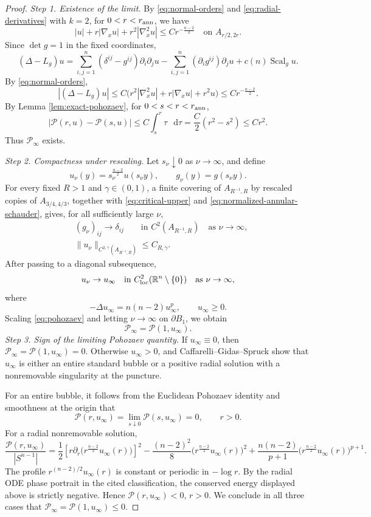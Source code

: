 \documentclass[11pt]{article}
\numberwithin{equation}{section}
\theoremstyle{remark}
\newcommand{\R}{\mathbb R}
\newcommand{\Sph}{S}
\newcommand{\cP}{\mathcal P}
\newcommand{\pa}{\partial}
\newcommand{\norm}[1]{\lVert #1\rVert}
\newcommand{\dd}{\mathop{}\!\mathrm{d}}
\begin{document}
\par
\begin{proof}
\emph{Step 1. Existence of the limit.}
{
By \eqref{eq:normal-orders} and
\eqref{eq:radial-derivatives} with \(k=2\), for \(0<r<r_{\rm ann}\), we have
\[
 |u|+r|\nabla_xu|+r^2|\nabla_x^2u|
 \le Cr^{-\frac{n-2}{2}}
 \quad\text{on }A_{r/2,2r}.
\]
}
{
Since \(\det g=1\) in the fixed coordinates,
\[
 (\Delta-L_g)u
 =\sum_{i,j=1}^n(\delta^{ij}-g^{ij})\partial_i\partial_j u
  -\sum_{i,j=1}^n(\partial_i g^{ij})\partial_j u
  +c(n)\operatorname{Scal}_gu.
\]
By \eqref{eq:normal-orders},
}
\[
 |(\Delta-L_g)u|
 \le
 C\bigl(r^2|\nabla_x^2u|+r|\nabla_xu|+r^2u\bigr)
 \le Cr^{-\frac{n-2}{2}}.
\]
{By Lemma  \ref{lem:exact-pohozaev}, for
\(0<s<r<r_{\rm ann}\),}
\[
 |\cP(r,u)-\cP(s,u)|
 \le C\int_s^r \tau\,\dd\tau
 =\frac C2(r^2-s^2)
 \le Cr^2.
\]
Thus \(\cP_\infty\) exists.

\emph{Step 2. Compactness under rescaling.}
Let \(s_\nu\downarrow0\) as \(\nu\to\infty\), and define
\[
 u_\nu(y)=s_\nu^{\frac{n-2}{2}}u(s_\nu y),
 \qquad
 g_\nu(y)=g(s_\nu y).
\]
For every fixed \(R>1\) and \(\gamma\in(0,1)\),
{a finite covering of \(A_{R^{-1},R}\) by rescaled copies
of \(A_{3/4,4/3}\), together with \eqref{eq:critical-upper} and
\eqref{eq:normalized-annular-schauder}, gives, for all sufficiently
large \(\nu\),}
\[
 \begin{aligned}
 &(g_\nu)_{ij}
 \to\delta_{ij}
 \qquad \text{in }C^2(A_{R^{-1},R})
 \quad\text{as }\nu\to\infty,\\
 &\norm{u_\nu}_{C^{2,\gamma}(A_{R^{-1},R})}
 \le C_{R,\gamma}.
 \end{aligned}
\]
After passing to a diagonal subsequence,
\[
 u_\nu\to u_\infty
 \quad\text{in }C^2_{\rm loc}(\R^n\setminus\{0\})
 \quad\text{as }\nu\to\infty,
\]
where
\[
 -\Delta u_\infty=n(n-2)u_\infty^p,
 \qquad u_\infty\ge0.
\]
{Scaling \eqref{eq:pohozaev} and letting \(\nu\to\infty\) on
\(\pa B_1\), we obtain}
\[
 \cP_\infty=\cP(1,u_\infty).
\]
\emph{Step 3. Sign of the limiting Pohozaev quantity.}
If \(u_\infty\equiv0\), then
\(\cP_\infty=\cP(1,u_\infty)=0\).
Otherwise \(u_\infty>0\), and Caffarelli--Gidas--Spruck
\cite[Theorem  8.1 and Corollary  8.2]{CGS}
show that \(u_\infty\) is either an entire standard bubble or a positive
radial solution with a nonremovable singularity at the puncture.

{For an entire bubble, it follows from the Euclidean Pohozaev
identity and smoothness at the origin that}
\[
 \cP(r,u_\infty)=\lim_{s\downarrow0}\cP(s,u_\infty)=0,
 \qquad r>0.
\]
For a radial nonremovable solution,
\[
 \frac{\cP(r,u_\infty)}{|\Sph^{n-1}|}
 =\frac12\left[r\partial_r\bigl(r^{\frac{n-2}{2}}u_\infty(r)\bigr)\right]^2
 -\frac{(n-2)^2}{8}\bigl(r^{\frac{n-2}{2}}u_\infty(r)\bigr)^2
 +\frac{n(n-2)}{p+1}
 \bigl(r^{\frac{n-2}{2}}u_\infty(r)\bigr)^{p+1}.
\]
The profile \(r^{(n-2)/2}u_\infty(r)\) is constant or periodic in
\(-\log r\).
{By the radial ODE phase portrait in the cited
classification, the conserved energy displayed above is strictly negative.}
Hence \(\cP(r,u_\infty)<0\), \(r>0\).
We conclude in all three cases that
\(\cP_\infty=\cP(1,u_\infty)\le0\).


\end{proof}
\end{document}
